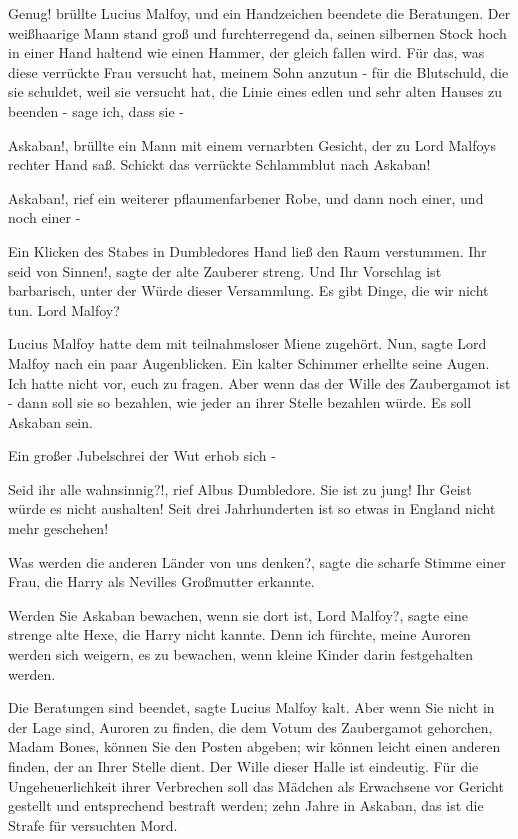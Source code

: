 \glqq{}Genug!\grqq{} brüllte Lucius Malfoy, und ein Handzeichen beendete die
Beratungen. Der weißhaarige Mann stand groß und furchterregend da, seinen
silbernen Stock hoch in einer Hand haltend wie einen Hammer, der gleich fallen
wird. \glqq{}Für das, was diese verrückte Frau versucht hat, meinem Sohn anzutun
- für die Blutschuld, die sie schuldet, weil sie versucht hat, die Linie eines
edlen und sehr alten Hauses zu beenden - sage ich, dass sie -\grqq{}

\glqq{}Askaban!\grqq{}, brüllte ein Mann mit einem vernarbten Gesicht, der zu
Lord Malfoys rechter Hand saß. \glqq{}Schickt das verrückte Schlammblut nach
Askaban!\grqq{}

\glqq{}Askaban!\grqq{}, rief ein weiterer pflaumenfarbener Robe, und dann noch
einer, und noch einer -

Ein Klicken des Stabes in Dumbledores Hand ließ den Raum verstummen. \glqq{}Ihr
seid von Sinnen!\grqq{}, sagte der alte Zauberer streng. \glqq{}Und Ihr Vorschlag
ist barbarisch, unter der Würde dieser Versammlung. Es gibt Dinge, die wir nicht
tun. Lord Malfoy?\grqq{}

Lucius Malfoy hatte dem mit teilnahmsloser Miene zugehört. \glqq{}Nun\grqq{},
sagte Lord Malfoy nach ein paar Augenblicken. Ein kalter Schimmer erhellte seine
Augen. \glqq{}Ich hatte nicht vor, euch zu fragen. Aber wenn das der Wille des
Zaubergamot ist - dann soll sie so bezahlen, wie jeder an ihrer Stelle bezahlen
würde. Es soll Askaban sein.\grqq{}

Ein großer Jubelschrei der Wut erhob sich -

\glqq{}Seid ihr alle wahnsinnig?!\grqq{}, rief Albus Dumbledore. \glqq{}Sie ist zu
jung! Ihr Geist würde es nicht aushalten! Seit drei Jahrhunderten ist so etwas
in England nicht mehr geschehen!\grqq{}

\glqq{}Was werden die anderen Länder von uns denken?\grqq{}, sagte die scharfe
Stimme einer Frau, die Harry als Nevilles Großmutter erkannte.

\glqq{}Werden Sie Askaban bewachen, wenn sie dort ist, Lord Malfoy?\grqq{}, sagte
eine strenge alte Hexe, die Harry nicht kannte. \glqq{}Denn ich fürchte, meine
Auroren werden sich weigern, es zu bewachen, wenn kleine Kinder darin
festgehalten werden.\grqq{}

\glqq{}Die Beratungen sind beendet\grqq{}, sagte Lucius Malfoy kalt. \glqq{}Aber
wenn Sie nicht in der Lage sind, Auroren zu finden, die dem Votum des
Zaubergamot gehorchen, Madam Bones, können Sie den Posten abgeben; wir können
leicht einen anderen finden, der an Ihrer Stelle dient. Der Wille dieser Halle
ist eindeutig. Für die Ungeheuerlichkeit ihrer Verbrechen soll das Mädchen als
Erwachsene vor Gericht gestellt und entsprechend bestraft werden; zehn Jahre in
Askaban, das ist die Strafe für versuchten Mord.\grqq{}


